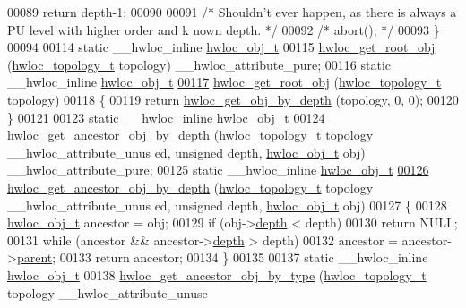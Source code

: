 \begin{DoxyCode}
{{00089       \textcolor{keywordflow}{return} depth-1;
00090 
00091   \textcolor{comment}{/* Shouldn't ever happen, as there is always a PU level with higher order and k
      nown depth.  */}
00092   \textcolor{comment}{/* abort(); */}
00093 \}
00094 
00114 \textcolor{keyword}{static} \_\_hwloc\_inline \hyperlink{a00016}{hwloc_obj_t}
00115 \hyperlink{a00053_gadbf58f6e187efbdb3cd9a8e30311b7d7}{hwloc_get_root_obj} (\hyperlink{a00039_ga9d1e76ee15a7dee158b786c30b6a6e38}{hwloc_topology_t} topology) \_\_hwloc\_attribute\_pure;
00116 \textcolor{keyword}{static} \_\_hwloc\_inline \hyperlink{a00016}{hwloc_obj_t}
\hypertarget{a00031_source_l00117}{}\hyperlink{a00053_gadbf58f6e187efbdb3cd9a8e30311b7d7}{00117} \hyperlink{a00053_gadbf58f6e187efbdb3cd9a8e30311b7d7}{hwloc_get_root_obj} (\hyperlink{a00039_ga9d1e76ee15a7dee158b786c30b6a6e38}{hwloc_topology_t} topology)
00118 \{
00119   \textcolor{keywordflow}{return} \hyperlink{a00047_gaedd78240b0c1108355586a268ec5a697}{hwloc_get_obj_by_depth} (topology, 0, 0);
00120 \}
00121 
00123 \textcolor{keyword}{static} \_\_hwloc\_inline \hyperlink{a00016}{hwloc_obj_t}
00124 \hyperlink{a00053_ga9b9d6af74eb0b78b1384aa66dd058ddc}{hwloc_get_ancestor_obj_by_depth} (\hyperlink{a00039_ga9d1e76ee15a7dee158b786c30b6a6e38}{hwloc_topology_t} topology \_\_hwloc\_attribute\_unus
      ed, \textcolor{keywordtype}{unsigned} depth, \hyperlink{a00016}{hwloc_obj_t} obj) \_\_hwloc\_attribute\_pure;
00125 \textcolor{keyword}{static} \_\_hwloc\_inline \hyperlink{a00016}{hwloc_obj_t}
\hypertarget{a00031_source_l00126}{}\hyperlink{a00053_ga9b9d6af74eb0b78b1384aa66dd058ddc}{00126} \hyperlink{a00053_ga9b9d6af74eb0b78b1384aa66dd058ddc}{hwloc_get_ancestor_obj_by_depth} (\hyperlink{a00039_ga9d1e76ee15a7dee158b786c30b6a6e38}{hwloc_topology_t} topology \_\_hwloc\_attribute\_unus
      ed, \textcolor{keywordtype}{unsigned} depth, \hyperlink{a00016}{hwloc_obj_t} obj)
00127 \{
00128   \hyperlink{a00016}{hwloc_obj_t} ancestor = obj;
00129   \textcolor{keywordflow}{if} (obj->\hyperlink{a00016_a9d82690370275d42d652eccdea5d3ee5}{depth} < depth)
00130     \textcolor{keywordflow}{return} NULL;
00131   \textcolor{keywordflow}{while} (ancestor && ancestor->\hyperlink{a00016_a9d82690370275d42d652eccdea5d3ee5}{depth} > depth)
00132     ancestor = ancestor->\hyperlink{a00016_adc494f6aed939992be1c55cca5822900}{parent};
00133   \textcolor{keywordflow}{return} ancestor;
00134 \}
00135 
00137 \textcolor{keyword}{static} \_\_hwloc\_inline \hyperlink{a00016}{hwloc_obj_t}
00138 \hyperlink{a00053_gac93e1a95a71add57ac841daef1b94e5e}{hwloc_get_ancestor_obj_by_type} (\hyperlink{a00039_ga9d1e76ee15a7dee158b786c30b6a6e38}{hwloc_topology_t} topology \_\_hwloc\_attribute\_unuse
}}
\end{DoxyCode}
